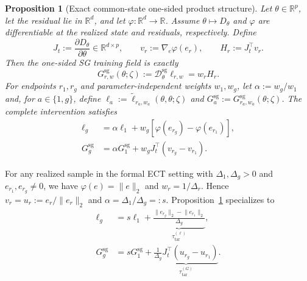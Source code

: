 \documentclass{article}
\newcommand{\Dsg}{\mathcal{D}^{\mathrm{sg}}_\theta}
\newtheorem{proposition}{Proposition}
\begin{document}
\begin{proposition}[Exact common-state one-sided product structure]
\label{prop:sg-product-structure}
Let $\theta\in\mathbb{R}^p$, let the residual lie in $\mathbb{R}^d$, and let
$\varphi:\mathbb{R}^d\to\mathbb{R}$. Assume $\theta\mapsto D_\theta$ and
$\varphi$ are differentiable at the realized state and residuals,
respectively. Define
\begin{equation}
  J_t:=\frac{\partial D_\theta}{\partial\theta}
    \in\mathbb{R}^{d\times p},
  \qquad
  v_r:=\nabla_e\varphi(e_r),
  \qquad
  H_r:=J_t^\top v_r.
  \label{eq:sg-unweighted-field}
\end{equation}
Then the one-sided SG training field is exactly
\begin{equation}
  G_{r,w}^{\mathrm{sg}}(\theta;\zeta)
  :=\Dsg\ell_{r,w}=w_r H_r.
  \label{eq:sg-product-structure}
\end{equation}
For endpoints $r_1,r_g$ and parameter-independent weights $w_1,w_g$, let
$\alpha:=w_g/w_1$ and, for $a\in\{1,g\}$, define
$\ell_a:=\widetilde\ell_{r_a,w_a}(\theta,\theta;\zeta)$ and
$G_a^{\mathrm{sg}}:=G_{r_a,w_a}^{\mathrm{sg}}(\theta;\zeta)$.
The complete intervention satisfies
\begin{align}
  \ell_g
  &=\alpha\ell_1
    +w_g\!\left[\varphi(e_{r_g})-\varphi(e_{r_1})\right],
  \label{eq:general-loss-decomposition}\\
  G_g^{\mathrm{sg}}
  &=\alpha G_1^{\mathrm{sg}}
    +w_gJ_t^\top(v_{r_g}-v_{r_1}).
  \label{eq:general-weight-decomposition}
\end{align}
\end{proposition}

For any realized sample in the formal ECT setting with
$\Delta_1,\Delta_g>0$ and $e_{r_1},e_{r_g}\neq0$, we have
$\varphi(e)=\lVert e\rVert_2$ and $w_r=1/\Delta_r$. Hence
$v_r=u_r:=e_r/\lVert e_r\rVert_2$ and
$\alpha=\Delta_1/\Delta_g=:s$. Proposition~\ref{prop:sg-product-structure}
specializes to
\begin{align}
  \ell_g
  &=s\ell_1
    +\underbrace{\frac{\lVert e_{r_g}\rVert_2
      -\lVert e_{r_1}\rVert_2}{\Delta_g}}
      _{\tau^{(\ell)}_{\mathrm{tar}}},
  \label{eq:exact-ect-loss-decomposition}\\
  G_g^{\mathrm{sg}}
  &=sG_1^{\mathrm{sg}}
    +\underbrace{\frac{1}{\Delta_g}J_t^\top
      \left(u_{r_g}-u_{r_1}\right)}
      _{\tau^{(G)}_{\mathrm{tar}}}.
  \label{eq:exact-ect-gradient-decomposition}
\end{align}
\end{document}
